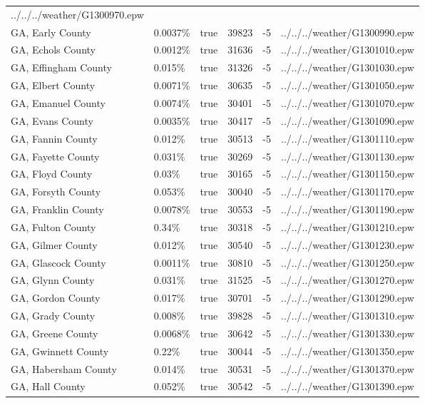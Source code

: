 \begin{longtable}[]{@{}llllll@{}}
../../../weather/G1300970.epw \\
GA, Early County & 0.0037\% & true & 39823 & -5 &
../../../weather/G1300990.epw \\
GA, Echols County & 0.0012\% & true & 31636 & -5 &
../../../weather/G1301010.epw \\
GA, Effingham County & 0.015\% & true & 31326 & -5 &
../../../weather/G1301030.epw \\
GA, Elbert County & 0.0071\% & true & 30635 & -5 &
../../../weather/G1301050.epw \\
GA, Emanuel County & 0.0074\% & true & 30401 & -5 &
../../../weather/G1301070.epw \\
GA, Evans County & 0.0035\% & true & 30417 & -5 &
../../../weather/G1301090.epw \\
GA, Fannin County & 0.012\% & true & 30513 & -5 &
../../../weather/G1301110.epw \\
GA, Fayette County & 0.031\% & true & 30269 & -5 &
../../../weather/G1301130.epw \\
GA, Floyd County & 0.03\% & true & 30165 & -5 &
../../../weather/G1301150.epw \\
GA, Forsyth County & 0.053\% & true & 30040 & -5 &
../../../weather/G1301170.epw \\
GA, Franklin County & 0.0078\% & true & 30553 & -5 &
../../../weather/G1301190.epw \\
GA, Fulton County & 0.34\% & true & 30318 & -5 &
../../../weather/G1301210.epw \\
GA, Gilmer County & 0.012\% & true & 30540 & -5 &
../../../weather/G1301230.epw \\
GA, Glascock County & 0.0011\% & true & 30810 & -5 &
../../../weather/G1301250.epw \\
GA, Glynn County & 0.031\% & true & 31525 & -5 &
../../../weather/G1301270.epw \\
GA, Gordon County & 0.017\% & true & 30701 & -5 &
../../../weather/G1301290.epw \\
GA, Grady County & 0.008\% & true & 39828 & -5 &
../../../weather/G1301310.epw \\
GA, Greene County & 0.0068\% & true & 30642 & -5 &
../../../weather/G1301330.epw \\
GA, Gwinnett County & 0.22\% & true & 30044 & -5 &
../../../weather/G1301350.epw \\
GA, Habersham County & 0.014\% & true & 30531 & -5 &
../../../weather/G1301370.epw \\
GA, Hall County & 0.052\% & true & 30542 & -5 &
../../../weather/G1301390.epw \\

\end{longtable}
